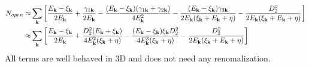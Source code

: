 

\begin{equation}
\begin{split}
N_{open}\approx&\sum_\vk\mbr{\frac{E_\vk-\xi_\vk}{2E_\vk}+\frac{\gamma_{1\vk}}{2E_\vk}
	-\frac{(E_\vk-\xi_\vk)(\gamma_{1\vk}+\gamma_{2\vk})}{4E_\vk^2}
	-\frac{(E_\vk-\xi_\vk)\gamma_{3\vk}}{2E_\vk(\xi_\vk+E_\vk+\eta)}
	-\frac{D_{2}^{2}}{2E_\vk(\xi_\vk+E_\vk+\eta)}}\\
	\approx&\sum_\vk\mbr{\frac{E_\vk-\xi_\vk}{2E_\vk}+\frac{{D_{2}^{2}(E_{\vk}+\xi_{\vk})}}{4E_\vk^{2}(\xi_{\vk}+\eta)}
	-\frac{(E_\vk-\xi_\vk)\xi_{\vk}D_{2}^{2}}{4E_\vk^3(\xi_{\vk}+\eta)}
	-\frac{D_{2}^{2}}{2E_\vk(\xi_\vk+E_\vk+\eta)}}	
\end{split}
\end{equation}
All terms are well behaved in 3D and does not need any renomalization. 
%

